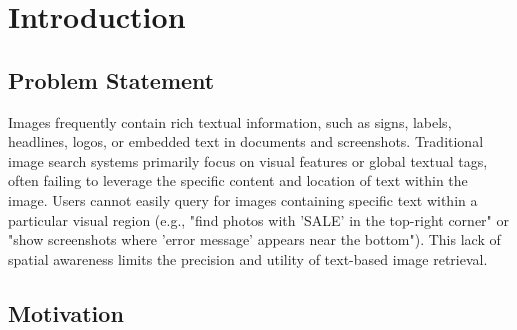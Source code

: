 \documentclass[manuscript,screen]{acmart}
\begin{document}



\maketitle

\section{Introduction}

\subsection{Problem Statement}

Images frequently contain rich textual information, such as signs, labels, headlines, logos, or embedded text in documents and screenshots. Traditional image search systems primarily focus on visual features or global textual tags, often failing to leverage the specific content and location of text within the image. Users cannot easily query for images containing specific text within a particular visual region (e.g., "find photos with 'SALE' in the top-right corner" or "show screenshots where 'error message' appears near the bottom"). This lack of spatial awareness limits the precision and utility of text-based image retrieval.

\subsection{Motivation}
\end{document}
